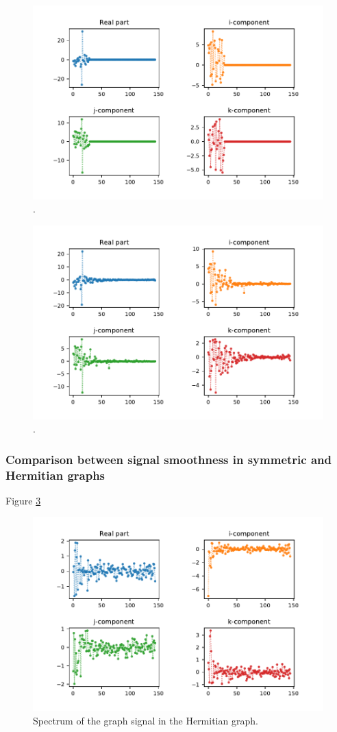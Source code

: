 \begin{figure}
	\centering
	\includegraphics[width=0.7\linewidth]{thesis/Figures/ideal_filter_output.pdf}
	\caption{.}
	\label{fig:ideal_filter_output}
\end{figure}

\begin{figure}
	\centering
	\includegraphics[width=0.7\linewidth]{thesis/Figures/qlms_filter_output.pdf}
	\caption{.}
	\label{fig:qlms_filter_output}
\end{figure}

\subsubsection{Comparison between signal smoothness in symmetric and Hermitian graphs}


Figure \ref{fig:uk_qgft_spectrumsig_hermitian}

\begin{figure}
	\centering
	\includegraphics[width=0.7\linewidth]{thesis/Figures/uk_qgft_spectrumsig_hermitian.pdf}
	\caption{Spectrum of the graph signal in the Hermitian graph.}
	\label{fig:uk_qgft_spectrumsig_hermitian}
\end{figure}